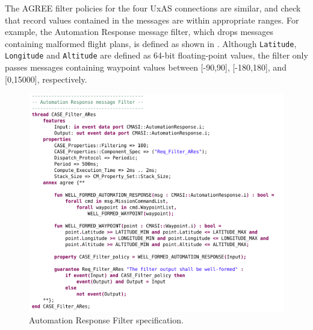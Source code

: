 The AGREE filter policies for the four UxAS connections are similar, and check that record values contained in the messages are within appropriate ranges.  For example, the Automation Response message filter, which drops messages containing malformed flight plans, is defined as shown in .  Although \texttt{Latitude}, \texttt{Longitude} and \texttt{Altitude} are defined as 64-bit floating-point values, the filter only passes messages containing waypoint values between [-90,90], [-180,180], and [0,15000], respectively. 

\begin{figure}[h]
	\centering
	\includegraphics[width=1\columnwidth]{figs/automation-response-filter.png}
	\caption{Automation Response Filter specification.} 
	\label{fig:automation-response-filter} 
\end{figure}

